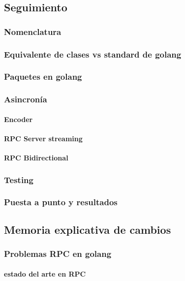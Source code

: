 \subsection{Seguimiento}\label{subsec:seguimiento}
    \subsubsection{Nomenclatura}
    \subsubsection{Equivalente de clases vs standard de golang}
    \subsubsection{Paquetes en golang}
    \subsubsection{Asincronía}\label{subsec:asincronia}
        \paragraph{Encoder}
        \paragraph{RPC Server streaming}
        \paragraph{RPC Bidirectional}
    \subsubsection{Testing}
    \subsubsection{Puesta a punto y resultados}
\subsection{Memoria explicativa de cambios}\label{subsec:memoria explicativa de cambios}
    \subsubsection{Problemas RPC en golang}\label{subsec:problemas-rpc-en-golang}
        \paragraph{estado del arte en RPC}
